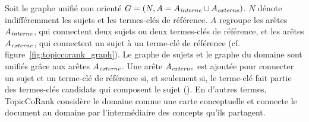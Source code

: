        Soit le graphe unifié non orienté $G = (N, A =
        A_{\textnormal{\textit{interne}}} \cup
        A_{\textnormal{\textit{externe}}})$. $N$ dénote indifféremment les
        sujets et les termes-clés de référence. $A$ regroupe les arêtes
        $A_{\textnormal{\textit{interne}}}$, qui connectent deux sujets ou deux
        termes-clés de référence, et les arêtes
        $A_{\textnormal{\textit{externe}}}$, qui connectent un sujet à un
        terme-clé de référence (cf. figure~\ref{fig:topiccorank_graph}). Le
        graphe de sujets et le graphe du domaine sont unifiés grâce aux arêtes
        $A_{\textnormal{\textit{externe}}}$. Une arête
        $A_{\textnormal{\textit{externe}}}$ est ajoutée pour connecter un sujet
        et un terme-clé de référence si, et seulement si, le terme-clé fait
        partie des termes-clés candidats qui composent le sujet
        (). En d'autres termes, TopicCoRank considère le domaine
        comme une carte conceptuelle et connecte le document au domaine par
        l'intermédiaire des concepts qu'ils partagent.
